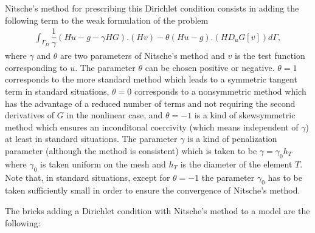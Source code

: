 \documentclass[a4paper,11pt,english]{sphinxmanual}
\begin{document}
Nitsche’s method for prescribing this Dirichlet condition consists in adding the following term to the weak formulation of the problem
\begin{equation*}
\begin{split}\int_{\Gamma_D} \dfrac{1}{\gamma}(Hu-g-\gamma HG).(Hv) - \theta(Hu-g).(HD_uG[v])d\Gamma,\end{split}
\end{equation*}
where \(\gamma\) and \(\theta\) are two parameters of Nitsche’s method and \(v\) is the test function corresponding to \(u\).
The parameter \(\theta\) can be chosen positive or negative. \(\theta = 1\) corresponds to the more standard method which leads to a symmetric tangent term in standard situations, \(\theta = 0\) corresponds to a non\sphinxhyphen{}symmetric method which has the advantage of a reduced number of terms and not requiring the second derivatives of \(G\) in the nonlinear case, and \(\theta = -1\) is a kind of skew\sphinxhyphen{}symmetric method which ensures an inconditonal coercivity (which means independent of \(\gamma\)) at least in standard situations.
The parameter \(\gamma\) is a kind of penalization parameter (although the method is consistent) which is taken to be \(\gamma = \gamma_0 h_T\) where \(\gamma_0\) is taken uniform on the mesh and \(h_T\) is the diameter of the element \(T\).
Note that, in standard situations, except for \(\theta = -1\) the parameter \(\gamma_0\) has to be taken sufficiently small in order to ensure the convergence of Nitsche’s method.

The bricks adding a Dirichlet condition with Nitsche’s method to a model are the following:

\begin{sphinxVerbatim}[commandchars=\\\{\}]
          
      
        
       
        
\end{sphinxVerbatim}
\end{document}
